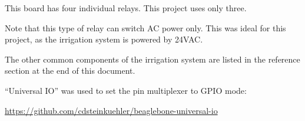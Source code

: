 This board has four individual relays.  This project uses only three.

Note that this type of relay can switch AC power only.  This was ideal for this 
project, as the irrigation system is powered by 24VAC.

The other common components of the irrigation system are listed in the 
reference section at the end of this document.

``Universal IO'' was used to set the pin multiplexer to GPIO mode:

\url{https://github.com/cdsteinkuehler/beaglebone-universal-io}




